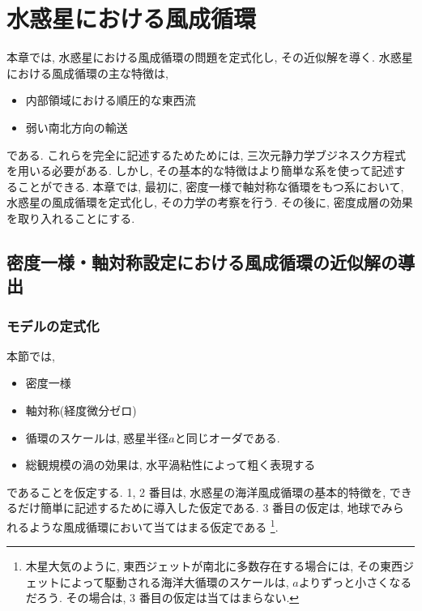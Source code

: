 \chapter{水惑星における風成循環}

本章では, 水惑星における風成循環の問題を定式化し, その近似解を導く. 
水惑星における風成循環の主な特徴は, 
\begin{itemize}
 \item 内部領域における順圧的な東西流
 \item 弱い南北方向の輸送
\end{itemize}
である. 
これらを完全に記述するためためには, 三次元静力学ブジネスク方程式を用いる必要がある. 
しかし, その基本的な特徴はより簡単な系を使って記述することができる. 
本章では, 最初に, 密度一様で軸対称な循環をもつ系において, 
水惑星の風成循環を定式化し, その力学の考察を行う. 
その後に, 密度成層の効果を取り入れることにする. 

\section{密度一様・軸対称設定における風成循環の近似解の導出}
\subsection{モデルの定式化}

本節では, 
\begin{itemize}
 \item 密度一様
 \item 軸対称(経度微分ゼロ)
 \item 循環のスケールは, 惑星半径$a$と同じオーダである. 
 \item 総観規模の渦の効果は, 水平渦粘性によって粗く表現する
\end{itemize}
であることを仮定する. 
1, 2 番目は, 水惑星の海洋風成循環の基本的特徴を, 
できるだけ簡単に記述するために導入した仮定である. 
3 番目の仮定は, 地球でみられるような風成循環において当てはまる仮定である%
\footnote{
木星大気のように, 東西ジェットが南北に多数存在する場合には, 
その東西ジェットによって駆動される海洋大循環のスケールは, $a$よりずっと小さくなるだろう. 
その場合は, 3 番目の仮定は当てはまらない. 
}.

